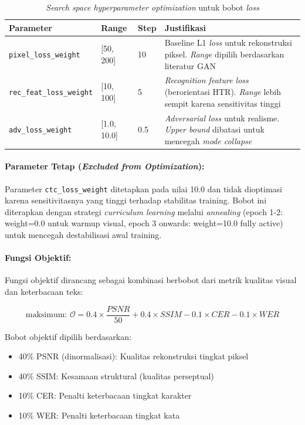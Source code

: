 \documentclass[12pt,a4paper]{article}
\begin{document}
\begin{table}[H]
\centering
\caption{\textit{Search space hyperparameter optimization} untuk bobot \textit{loss}}
\label{tab:hpo-search-space}
\small
\begin{tabular}{|l|l|l|p{5.5cm}|}
\hline
\textbf{Parameter} & \textbf{Range} & \textbf{Step} & \textbf{Justifikasi} \\ \hline
\texttt{pixel\_loss\_weight} & [50, 200] & 10 & Baseline L1 \textit{loss} untuk rekonstruksi piksel. \textit{Range} dipilih berdasarkan literatur GAN \\ \hline
\texttt{rec\_feat\_loss\_weight} & [10, 100] & 5 & \textit{Recognition feature loss} (berorientasi HTR). \textit{Range} lebih sempit karena sensitivitas tinggi \\ \hline
\texttt{adv\_loss\_weight} & [1.0, 10.0] & 0.5 & \textit{Adversarial loss} untuk realisme. \textit{Upper bound} dibatasi untuk mencegah \textit{mode collapse} \\ \hline
\end{tabular}
\end{table}

\paragraph{Parameter Tetap (\textit{Excluded from Optimization}):}

Parameter \texttt{ctc\_loss\_weight} ditetapkan pada nilai 10.0 dan tidak dioptimasi karena sensitivitasnya yang tinggi terhadap stabilitas training. Bobot ini diterapkan dengan strategi \textit{curriculum learning} melalui \textit{annealing} (epoch 1-2: weight=0.0 untuk warmup visual, epoch 3 onwards: weight=10.0 fully active) untuk mencegah destabilisasi awal training.

\paragraph{Fungsi Objektif:}

Fungsi objektif dirancang sebagai kombinasi berbobot dari metrik kualitas visual dan keterbacaan teks:

\begin{equation}
\text{maksimum: } \mathcal{O} = 0.4 \times \frac{PSNR}{50} + 0.4 \times SSIM - 0.1 \times CER - 0.1 \times WER
\end{equation}

Bobot objektif dipilih berdasarkan:
\begin{itemize}[leftmargin=*, nosep]
\item 40\% PSNR (dinormalisasi): Kualitas rekonstruksi tingkat piksel
\item 40\% SSIM: Kesamaan struktural (kualitas perseptual)
\item 10\% CER: Penalti keterbacaan tingkat karakter
\item 10\% WER: Penalti keterbacaan tingkat kata
\end{itemize}
\end{document}
